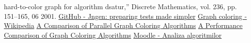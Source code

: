 \documentclass[runningheads]{llncs}
\begin{document}
\begin{thebibliography}{8}
hard-to-color graph for algorithm dsatur,” Discrete Mathematics, vol.
236, pp. 151–165, 06 2001.
\href{https://github.com/ifsmirnov/jngen}{GitHub - Jngen: preparing tests made simpler}
\bibitem{}
\href{https://en.wikipedia.org/wiki/Graph_coloring}{Graph coloring - Wikipedia}
\bibitem{}
\href{https://citeseerx.ist.psu.edu/document?repid=rep1&type=pdf&doi=203a7b17267a28a06808bfb3b0b9571e32d15503}{A Comparison of Parallel Graph Coloring Algorithms}
\bibitem{}
\href{https://dergipark.org.tr/en/download/article-file/254140}{A Performance Comparison of Graph Coloring Algorithms}
\bibitem{}
\href{https://curs.upb.ro/2022/mod/folder/view.php?id=77105}{Moodle - Analiza algoritmilor}
% 
\end{thebibliography}
\end{document}
